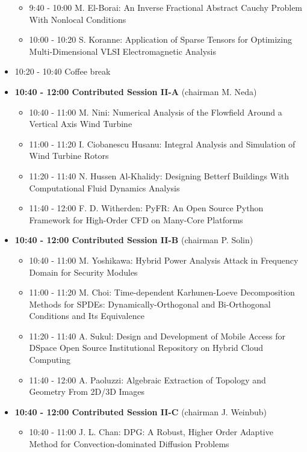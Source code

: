 \documentclass[10pt, A4]{article}%
\begin{document}
\begin{itemize}
\begin{itemize}
    \item 9:40 - 10:00 {M. El-Borai}: {An Inverse Fractional Abstract Cauchy Problem With Nonlocal Conditions} 
    \item 10:00 - 10:20 {S. Koranne}: {Application of Sparse Tensors for Optimizing Multi-Dimensional VLSI Electromagnetic Analysis}
  \end{itemize}
  \item 10:20 - 10:40 Coffee break
  \item {\bf 10:40 - 12:00 Contributed Session II-A} (chairman M. Neda) 
  \begin{itemize}
    \item 10:40 - 11:00 {M. Nini}: {Numerical Analysis of the Flowfield Around a Vertical Axis Wind Turbine}
    \item 11:00 - 11:20 {I. Ciobanescu Husanu}: {Integral Analysis and Simulation of Wind Turbine Rotors}
    \item 11:20 - 11:40 {N. Hussen Al-Khalidy}: {Designing Betterf Buildings With Computational Fluid Dynamics Analysis}
    \item 11:40 - 12:00 {F. D. Witherden}: {PyFR: An Open Source Python Framework for High-Order CFD on Many-Core Platforms}
  \end{itemize}
  \item {\bf 10:40 - 12:00 Contributed Session II-B} (chairman P. Solin) 
  \begin{itemize}
    \item 10:40 - 11:00 {M. Yoshikawa}: {Hybrid Power Analysis Attack in Frequency Domain for Security Modules}
    \item 11:00 - 11:20 {M. Choi}: {Time-dependent Karhunen-Loeve Decomposition Methods for SPDEs: Dynamically-Orthogonal and Bi-Orthogonal Conditions and Its Equivalence}
    \item 11:20 - 11:40 {A. Sukul}: {Design and Development of Mobile Access for DSpace Open Source Institutional Repository on Hybrid Cloud Computing} %
    \item 11:40 - 12:00 {A. Paoluzzi}: {Algebraic Extraction of Topology and Geometry From 2D/3D Images}
    \end{itemize}
    \newpage
  \item {\bf 10:40 - 12:00 Contributed Session II-C} (chairman J. Weinbub) 
  \begin{itemize}
    \item 10:40 - 11:00 {J. L. Chan}: {DPG: A Robust, Higher Order Adaptive Method for Convection-dominated Diffusion Problems}

\end{itemize}
\end{itemize}
\end{document}
